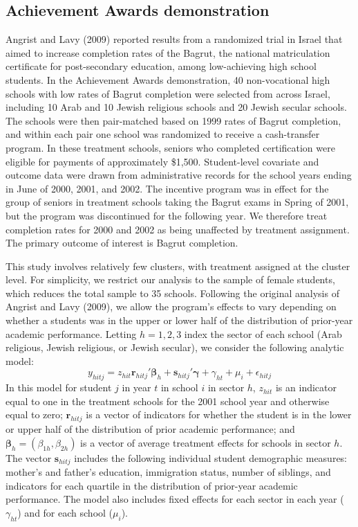 \documentclass[12pt]{article}
\begin{document}
\hypertarget{achievement-awards-demonstration}{%
\subsection{Achievement Awards
demonstration}\label{achievement-awards-demonstration}}

Angrist and Lavy (2009) reported results from a randomized trial in
Israel that aimed to increase completion rates of the Bagrut, the
national matriculation certificate for post-secondary education, among
low-achieving high school students. In the Achievement Awards
demonstration, 40 non-vocational high schools with low rates of Bagrut
completion were selected from across Israel, including 10 Arab and 10
Jewish religious schools and 20 Jewish secular schools. The schools were
then pair-matched based on 1999 rates of Bagrut completion, and within
each pair one school was randomized to receive a cash-transfer program.
In these treatment schools, seniors who completed certification were
eligible for payments of approximately \$1,500. Student-level covariate
and outcome data were drawn from administrative records for the school
years ending in June of 2000, 2001, and 2002. The incentive program was
in effect for the group of seniors in treatment schools taking the
Bagrut exams in Spring of 2001, but the program was discontinued for the
following year. We therefore treat completion rates for 2000 and 2002 as
being unaffected by treatment assignment. The primary outcome of
interest is Bagrut completion.

This study involves relatively few clusters, with treatment assigned at
the cluster level. For simplicity, we restrict our analysis to the
sample of female students, which reduces the total sample to 35 schools.
Following the original analysis of Angrist and Lavy (2009), we allow the
program's effects to vary depending on whether a students was in the
upper or lower half of the distribution of prior-year academic
performance. Letting \(h = 1,2,3\) index the sector of each school (Arab
religious, Jewish religious, or Jewish secular), we consider the
following analytic model: \begin{equation}
\label{eq:AL_ATE}
y_{hitj} = z_{hit}\mathbf{r}_{hitj}'\boldsymbol\beta_h + \mathbf{s}_{hitj}'\boldsymbol\gamma + \gamma_{ht} + \mu_{i} + \epsilon_{hitj}
\end{equation} In this model for student \(j\) in year \(t\) in school
\(i\) in sector \(h\), \(z_{hit}\) is an indicator equal to one in the
treatment schools for the 2001 school year and otherwise equal to zero;
\(\mathbf{r}_{hitj}\) is a vector of indicators for whether the student
is in the lower or upper half of the distribution of prior academic
performance; and
\(\boldsymbol\beta_h = \left(\beta_{1h}, \beta_{2h}\right)\) is a vector
of average treatment effects for schools in sector \(h\). The vector
\(\mathbf{s}_{hitj}\) includes the following individual student
demographic measures: mother's and father's education, immigration
status, number of siblings, and indicators for each quartile in the
distribution of prior-year academic performance. The model also includes
fixed effects for each sector in each year (\(\gamma_{ht}\)) and for
each school (\(\mu_{i}\)).
\end{document}
